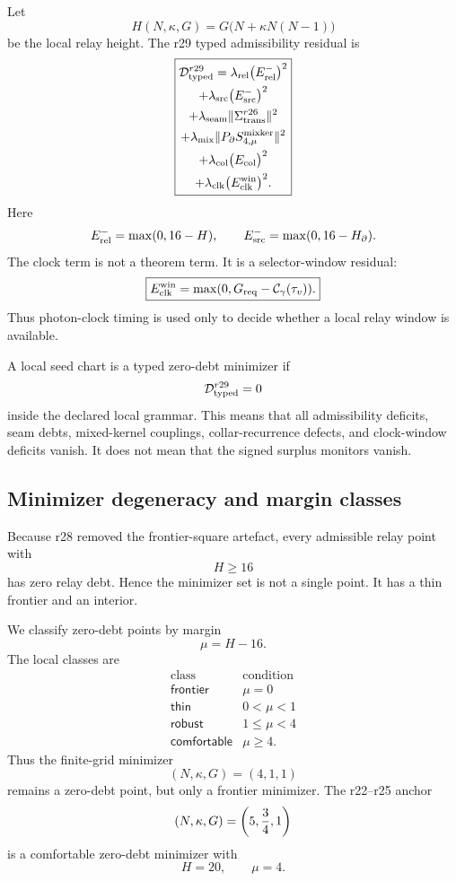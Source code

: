 Let
\[
H(N,\kappa,G)=G\bigl(N+\kappa N(N-1)\bigr)
\]
be the local relay height.  The r29 typed admissibility residual is
\[
\boxed{
\begin{gathered}
\mathcal D_{\rm typed}^{r29}
=
\lambda_{\rm rel}\bigl(E_{\rm rel}^{-}\bigr)^2
\\+
\lambda_{\rm src}\bigl(E_{\rm src}^{-}\bigr)^2
\\+
\lambda_{\rm seam}\|\Sigma_{\rm trans}^{r26}\|^2
\\+
\lambda_{\rm mix}\|P_{\partial}S_{4,\mu}^{\rm mixker}\|^2
\\+
\lambda_{\rm col}\bigl(E_{\rm col}\bigr)^2
\\+
\lambda_{\rm clk}\bigl(E_{\rm clk}^{\rm win}\bigr)^2.
\end{gathered}
}
\]
Here
\[
E_{\rm rel}^{-}=\max(0,16-H),
\qquad
E_{\rm src}^{-}=\max(0,16-H_{\partial}).
\]
The clock term is not a theorem term.  It is a selector-window residual:
\[
\boxed{
E_{\rm clk}^{\rm win}
=
\max(0,G_{\rm req}-\mathcal C_{\gamma}(\tau_v)).
}
\]
Thus photon-clock timing is used only to decide whether a local relay window is
available.

\begin{definition}
\label{def:v470-r29-typed-zero-debt-minimizer}
A local seed chart is a typed zero-debt minimizer if
\[
\mathcal D_{\rm typed}^{r29}=0
\]
inside the declared local grammar.  This means that all admissibility deficits,
seam debts, mixed-kernel couplings, collar-recurrence defects, and clock-window
deficits vanish.  It does not mean that the signed surplus monitors vanish.
\end{definition}

\subsection{Minimizer degeneracy and margin classes}
\label{subsec:v470-r29-minimizer-degeneracy-margin-classes}

Because r28 removed the frontier-square artefact, every admissible relay point
with
\[
H\geq16
\]
has zero relay debt.  Hence the minimizer set is not a single point.  It has a
thin frontier and an interior.

We classify zero-debt points by margin
\[
\mu=H-16.
\]
The local classes are
\[
\boxed{
\begin{array}{c|c}
\text{class} & \text{condition}\\
\hline
\mathsf{frontier} & \mu=0\\
\mathsf{thin} & 0<\mu<1\\
\mathsf{robust} & 1\leq\mu<4\\
\mathsf{comfortable} & \mu\geq4.
\end{array}
}
\]
Thus the finite-grid minimizer
\[
(N,\kappa,G)=(4,1,1)
\]
remains a zero-debt point, but only a frontier minimizer.  The r22--r25 anchor
\[
(N,\kappa,G)=\left(5,{3\over4},1\right)
\]
is a comfortable zero-debt minimizer with
\[
H=20,
\qquad
\mu=4.
\]

